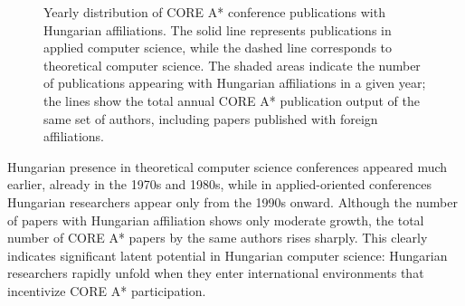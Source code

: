 \documentclass[12pt,a4paper]{article}
\begin{document}
\begin{figure}[htbp]
\centering
{}\hungarianAstar
{}\abroadAstar
{}
\caption{Yearly distribution of CORE A\!* conference publications with Hungarian affiliations.
The solid line represents publications in applied computer science, while the dashed line corresponds to theoretical computer science. 
The shaded areas indicate the number of publications appearing with Hungarian affiliations in a given year; the lines show the total annual CORE A\!* publication output of the same set of authors, including papers published with foreign affiliations.}
\label{fig:hungarian_astar_stacked}
\end{figure}

Hungarian presence in theoretical computer science conferences appeared much earlier, already in the 1970s and 1980s, while in applied-oriented conferences Hungarian researchers appear only from the 1990s onward. Although the number of papers with Hungarian affiliation shows only moderate growth, the total number of CORE A\!* papers by the same authors rises sharply. This clearly indicates significant latent potential in Hungarian computer science: Hungarian researchers rapidly unfold when they enter international environments that incentivize CORE A\!* participation.
\end{document}
